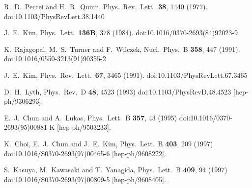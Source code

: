 \documentclass[12pt, a4paper]{article}
\begin{document}
\begin{thebibliography}{99}

  R.~D.~Peccei and H.~R.~Quinn,
  Phys.\ Rev.\ Lett.\  {\bf 38}, 1440 (1977).
  doi:10.1103/PhysRevLett.38.1440
  
  J.~E.~Kim,
  Phys.\ Lett.\  {\bf 136B}, 378 (1984).
  doi:10.1016/0370-2693(84)92023-9
  
  K.~Rajagopal, M.~S.~Turner and F.~Wilczek,
  Nucl.\ Phys.\ B {\bf 358}, 447 (1991).
  doi:10.1016/0550-3213(91)90355-2
  
  J.~E.~Kim,
  Phys.\ Rev.\ Lett.\  {\bf 67}, 3465 (1991).
  doi:10.1103/PhysRevLett.67.3465
  
  D.~H.~Lyth,
  Phys.\ Rev.\ D {\bf 48}, 4523 (1993)
  doi:10.1103/PhysRevD.48.4523
  [hep-ph/9306293].
  
  E.~J.~Chun and A.~Lukas,
  Phys.\ Lett.\ B {\bf 357}, 43 (1995)
  doi:10.1016/0370-2693(95)00881-K
  [hep-ph/9503233].
  
  K.~Choi, E.~J.~Chun and J.~E.~Kim,
  Phys.\ Lett.\ B {\bf 403}, 209 (1997)
  doi:10.1016/S0370-2693(97)00465-6
  [hep-ph/9608222].
  
  S.~Kasuya, M.~Kawasaki and T.~Yanagida,
  Phys.\ Lett.\ B {\bf 409}, 94 (1997)
  doi:10.1016/S0370-2693(97)00809-5
  [hep-ph/9608405].
  

\end{thebibliography}
\end{document}
